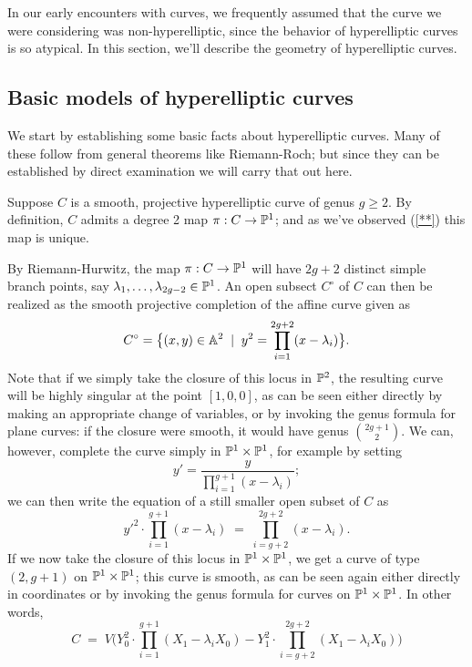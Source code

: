 In our early encounters with curves, we frequently assumed that the curve we were considering was non-hyperelliptic, since the behavior of hyperelliptic curves is so atypical. In this section, we'll describe the geometry of hyperelliptic curves.

\subsection{Basic models of hyperelliptic curves}

We start by establishing some basic facts about hyperelliptic curves. Many of these follow from general theorems like Riemann-Roch; but since they can be established by direct examination we will carry that out here.

Suppose $C$ is a smooth, projective hyperelliptic curve of genus $g \geq 2$. By definition, $C$ admits a degree 2 map $\pi : C \to \PP^1$; and as we've observed (\ref{**}) this map is unique.

By Riemann-Hurwitz,  the map $\pi : C \to \PP^1$ will have $2g+2$ distinct simple branch points, say $\lambda_1,\dots,\lambda_{2g-2} \in \PP^1$. An open subsect $C^\circ$ of $C$ can then be realized as the smooth projective completion of the affine curve given as
$$
C^\circ = \big\{ (x,y) \in \AA^2 \; \mid \; y^2 = \prod_{i=1}^{2g+2} (x - \lambda_i) \big\}.
$$ 
  Note that if we simply take the closure of this locus in $\PP^2$, the resulting curve will be highly singular at the point $[1,0,0]$, as can be seen either  directly by making an appropriate change of variables, or by invoking the genus formula for plane curves: if the closure were smooth, it would have genus $\binom{2g+1}{2}$. We can, however, complete the curve simply in $\PP^1 \times \PP^1$, for example by setting 
$$
y' = \frac{y}{\prod_{i=1}^{g+1} (x - \lambda_i)};
$$
we can then write the equation of a still smaller open subset of $C$ as
$$
{y'}^2 \cdot \prod_{i=1}^{g+1} (x - \lambda_i) \; = \; \prod_{i=g+2}^{2g+2} (x - \lambda_i).
$$
If we now take the closure of this locus in $\PP^1 \times \PP^1$, we get a curve of type $(2,g+1)$ on $\PP^1 \times \PP^1$; this curve is smooth, as can be seen again either directly in coordinates or by invoking the genus formula for curves on $\PP^1 \times \PP^1$. In other words,
$$
C \; = \; V\Big(Y_0^2\cdot \prod_{i=1}^{g+1} (X_1 - \lambda_iX_0) - Y_1^2 \cdot \prod_{i=g+2}^{2g+2} (X_1 - \lambda_iX_0) \Big)
$$

